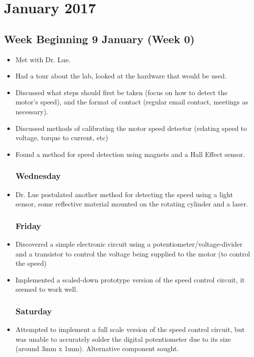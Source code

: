 \documentclass[a4]{report}
\begin{document}
	\chapter{January 2017}
	\section{Week Beginning 9 January (Week 0)}
	\begin{itemize}
		\subsection*{Monday}
		\item Met with Dr. Lue.
		\item Had a tour about the lab, looked at the hardware that would be used.
		\item Discussed what steps should first be taken (focus on how to detect the motor's speed), and the format of contact (regular email contact, meetings as necessary).
		\item Discussed methods of calibrating the motor speed detector (relating speed to voltage, torque to current, etc)
		\item Found a method for speed detection using magnets and a Hall Effect sensor.
		\subsection*{Wednesday}
		\item Dr. Lue postulated another method for detecting the speed using a light sensor, some reflective material mounted on the rotating cylinder and a laser.
		\subsection*{Friday}
		\item Discovered a simple electronic circuit using a potentiometer/voltage-divider and a transistor to control the voltage being supplied to the motor (to control the speed)
		\item Implemented a scaled-down prototype version of the speed control circuit, it seemed to work well.
		\subsection*{Saturday}
		\item Attempted to implement a full scale version of the speed control circuit, but was unable to accurately solder the digital potentiometer due to its size (around 3mm x 1mm). Alternative component sought.
	\end{itemize}
	\newpage
\end{document}
